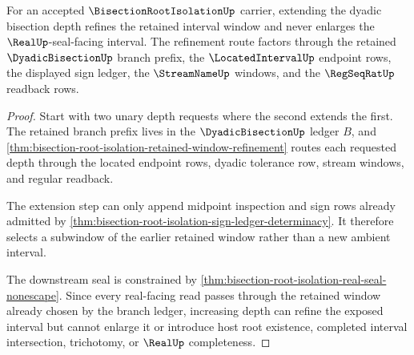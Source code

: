 \begin{theorem}
\label{thm:bisection-root-isolation-branch-monotonicity}
For an accepted $\BisectionRootIsolationUp$ carrier, extending the dyadic bisection depth refines the retained interval window and never enlarges the $\RealUp$-seal-facing interval. The refinement route factors through the retained $\DyadicBisectionUp$ branch prefix, the $\LocatedIntervalUp$ endpoint rows, the displayed sign ledger, the $\StreamNameUp$ windows, and the $\RegSeqRatUp$ readback rows.
\end{theorem}
\begin{proof}
Start with two unary depth requests where the second extends the first. The retained branch prefix lives in the $\DyadicBisectionUp$ ledger $B$, and \autoref{thm:bisection-root-isolation-retained-window-refinement} routes each requested depth through the located endpoint rows, dyadic tolerance row, stream windows, and regular readback.

The extension step can only append midpoint inspection and sign rows already admitted by \autoref{thm:bisection-root-isolation-sign-ledger-determinacy}. It therefore selects a subwindow of the earlier retained window rather than a new ambient interval.

The downstream seal is constrained by \autoref{thm:bisection-root-isolation-real-seal-nonescape}. Since every real-facing read passes through the retained window already chosen by the branch ledger, increasing depth can refine the exposed interval but cannot enlarge it or introduce host root existence, completed interval intersection, trichotomy, or $\RealUp$ completeness.
\end{proof}

